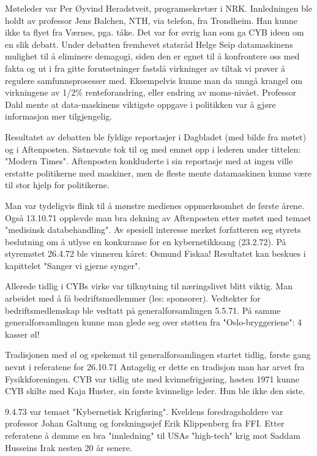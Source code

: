 \documentclass[../main.tex]{subfiles}
\begin{document}
Møteleder var Per Øyvind Heradstveit, programsekretær i NRK. Innledningen ble holdt av professor Jens Balchen, NTH, via telefon, fra Trondheim. Han kunne ikke ta flyet fra Værnes, pga. tåke. Det var for øvrig han som ga CYB ideen om en slik debatt. Under debatten fremhevet statsråd Helge Seip datamaskinens mulighet til å eliminere demagogi, siden den er egnet til å konfrontere oss med fakta og ut i fra gitte forutsetninger fastslå virkninger av tiltak vi prøver å regulere samfunnsprosesser med. Eksempelvis kunne man da unngå krangel om virkningene av 1/2\% renteforandring, eller endring av moms-nivået. Professor Dahl mente at data-maskinens viktigste oppgave i politikken var å gjøre informasjon mer tilgjengelig.

Resultatet av debatten ble fyldige reportasjer i Dagbladet (med bilde fra møtet) og i Aftenposten. Sistnevnte tok til og med emnet opp i lederen under tittelen: "Modern Times". Aftenposten konkluderte i sin reportasje med at ingen ville erstatte politikerne med maskiner, men de fleste mente datamaskinen kunne være til stor hjelp for politikerne.

Man var tydeligvis flink til å mønstre medienes oppmerksomhet de første årene. Også 13.10.71 opplevde man bra dekning av Aftenposten etter møtet med temaet "medisinsk databehandling".
Av spesiell interesse merket forfatteren seg styrets beslutning om å utlyse en konkuranse for en kybernetikksang (23.2.72). På styremøtet 26.4.72 ble vinneren kåret: Osmund Fiskaa! Resultatet kan beskues i kapittelet "Sanger vi gjerne synger".

Allerede tidlig i CYBs virke var tilknytning til næringslivet blitt viktig. Man arbeidet med å få bedriftsmedlemmer (les: sponsorer). Vedtekter for bedriftsmedlemskap ble vedtatt på generalforsamlingen 5.5.71. På samme generalforsamlingen kunne man glede seg over støtten fra "Oslo-bryggeriene": 4 kasser øl!

Tradisjonen med øl og spekemat til generalforsamlingen startet tidlig, første gang nevnt i referatene for 26.10.71 Antagelig er dette en tradisjon man har arvet fra Fysikkforeningen.
CYB var tidlig ute med kvinnefrigjøring, høsten 1971 kunne CYB skilte med Kaja Huster, sin første kvinnelige leder. Hun ble ikke den siste.

9.4.73 var temaet "Kybernetisk Krigføring". Kveldens foredragsholdere var professor Johan Galtung og forskningssjef Erik Klippenberg fra FFI. Etter referatene å dømme en bra "innledning" til USAs "high-tech" krig mot Saddam Husseins Irak nesten 20 år senere.
\end{document}
